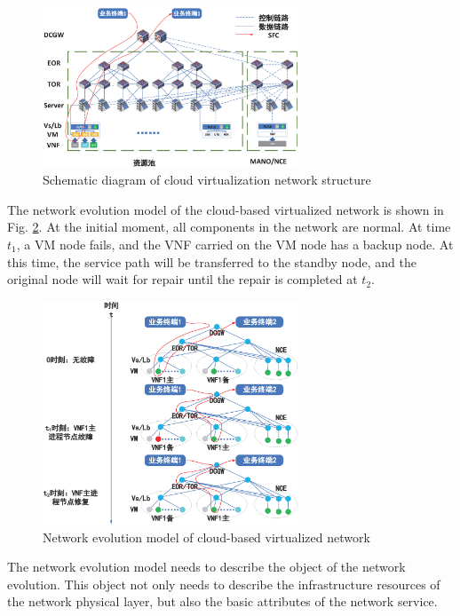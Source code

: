 \documentclass[journal]{IEEEtran}
\begin{document}
    \begin{figure}[!t]
        \begin{center}
            \includegraphics[width = 3in]{img/1.eps}
            \caption{Schematic diagram of cloud virtualization network structure}
            \label{fig1}
        \end{center}
    \end{figure}

    The network evolution model of the cloud-based virtualized network is shown in Fig. \ref{fig2}. At the initial moment, all components in the network are normal. At time $t_1$, a VM node fails, and the VNF carried on the VM node has a backup node. At this time, the service path will be transferred to the standby node, and the original node will wait for repair until the repair is completed at $t_2$.

    \begin{figure}[!t]
        \begin{center}
            \includegraphics[width = 3in]{img/2.eps}
            \caption{Network evolution model of cloud-based virtualized network}
            \label{fig2}
        \end{center}
    \end{figure}
	
	The network evolution model needs to describe the object of the network evolution. This object not only needs to describe the infrastructure resources of the network physical layer, but also the basic attributes of the network service.
	
\end{document}
